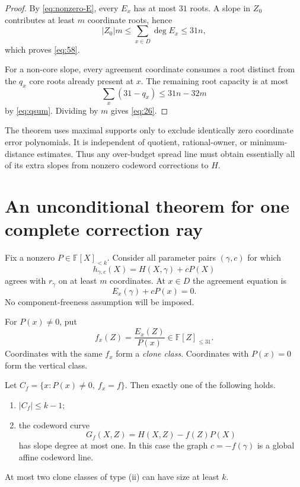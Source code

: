 \documentclass[11pt,a4paper]{amsart}
\numberwithin{equation}{section}
\theoremstyle{remark}
\newcommand{\F}{\mathbb F}\newcommand{\B}{\mathbb B}\newcommand{\K}{\mathbb K}\newcommand{\Z}{\mathbb Z}
\begin{document}
\begin{proof}
By \eqref{eq:nonzero-E}, every $E_x$ has at most $31$ roots.  A slope in $Z_0$ contributes at least $m$ coordinate roots, hence
\[
 |Z_0|m\le\sum_{x\in D}\deg E_x\le31n,
\]
which proves \eqref{eq:58}.

For a non-core slope, every agreement coordinate consumes a root distinct from the $q_x$ core roots already present at $x$.  The remaining root capacity is at most
\[
 \sum_x(31-q_x)\le31n-32m
\]
by \eqref{eq:qsum}.  Dividing by $m$ gives \eqref{eq:26}.
\end{proof}

\begin{remark}
The theorem uses maximal supports only to exclude identically zero coordinate error polynomials.  It is independent of quotient, rational-owner, or minimum-distance estimates.  Thus any over-budget spread line must obtain essentially all of its extra slopes from nonzero codeword corrections to $H$.
\end{remark}

\section{An unconditional theorem for one complete correction ray}

Fix a nonzero $P\in\F[X]_{<k}$.  Consider all parameter pairs $(\gamma,c)$ for which
\begin{equation}\label{eq:rayword}
 h_{\gamma,c}(X)=H(X,\gamma)+cP(X)
\end{equation}
agrees with $r_\gamma$ on at least $m$ coordinates.  At $x\in D$ the agreement equation is
\begin{equation}\label{eq:raycurve}
 E_x(\gamma)+cP(x)=0.
\end{equation}
No component-freeness assumption will be imposed.

For $P(x)\ne0$, put
\[
 f_x(Z)=\frac{E_x(Z)}{P(x)}\in\F[Z]_{\le31}.
\]
Coordinates with the same $f_x$ form a \emph{clone class}.  Coordinates with $P(x)=0$ form the vertical class.

\begin{lemma}\label{lem:clone}
Let $C_f=\{x:P(x)\ne0,\ f_x=f\}$.  Then exactly one of the following holds.
\begin{enumerate}[label=\textup{(\roman*)}]
\item $|C_f|\le k-1$;
\item the codeword curve
\[
 G_f(X,Z)=H(X,Z)-f(Z)P(X)
\]
has slope degree at most one.  In this case the graph $c=-f(\gamma)$ is a global affine codeword line.
\end{enumerate}
At most two clone classes of type \textup{(ii)} can have size at least $k$.
\end{lemma}
\end{document}
